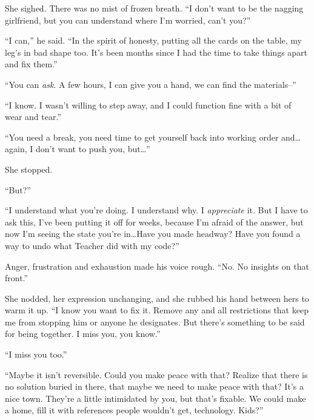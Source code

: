 She sighed.  There was no mist of frozen breath\emph{.  }``I don't want to be the nagging girlfriend, but you can understand where I'm worried, can't you?''



``I can,'' he said.  ``In the spirit of honesty, putting all the cards on the table, my leg's in bad shape too.  It's been months since I had the time to take things apart and fix them.''



``You can \emph{ask}.  A few hours, I can give you a hand, we can find the materials--''



``I know.  I wasn't willing to step away, and I could function fine with a bit of wear and tear.''



``You need a break, you need time to get yourself back into working order and\ldots again, I don't want to push you, but\ldots''



She stopped.



``But?''



``I understand what you're doing.  I understand why.  I \emph{appreciate} it.  But I have to ask this, I've been putting it off for weeks, because I'm afraid of the answer, but now I'm seeing the state you're in\ldots  Have you made headway?  Have you found a way to undo what Teacher did with my code?''



Anger, frustration and exhaustion made his voice rough.  ``No.  No insights on that front.''



She nodded, her expression unchanging, and she rubbed his hand between hers to warm it up.  ``I know you want to fix it.  Remove any and all restrictions that keep me from stopping him or anyone he designates.  But there's something to be said for being together.  I miss you, you know.''



``I miss you too.''



``Maybe it isn't reversible.  Could you make peace with that?  Realize that there is no solution buried in there, that maybe we need to make peace with that?  It's a nice town.  They're a little intimidated by you, but that's fixable.  We could make a home, fill it with references people wouldn't get, technology.  Kids?''



